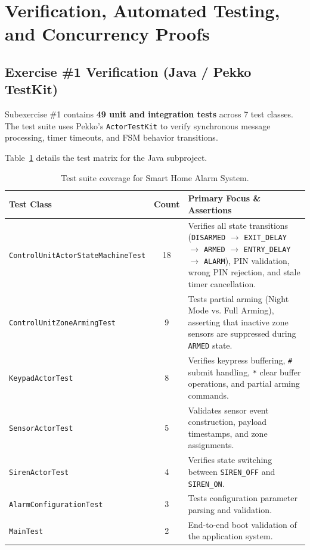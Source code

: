 \documentclass[11pt,a4paper]{article}
\begin{document}
\section{Verification, Automated Testing, and Concurrency Proofs}

\subsection{Exercise \#1 Verification (Java / Pekko TestKit)}

Subexercise \#1 contains \textbf{49 unit and integration tests} across 7 test classes. The test suite uses Pekko's \texttt{ActorTestKit} to verify synchronous message processing, timer timeouts, and FSM behavior transitions.

Table~\ref{tab:java-tests} details the test matrix for the Java subproject.

\begin{table}[h]
\centering
\small
\caption{Test suite coverage for Smart Home Alarm System.}
\label{tab:java-tests}
\begin{tabularx}{\textwidth}{l c >{\raggedright\arraybackslash}X}
\toprule
\textbf{Test Class} & \textbf{Count} & \textbf{Primary Focus \& Assertions} \\
\midrule
\texttt{ControlUnitActorStateMachineTest} & 18 & Verifies all state transitions (\texttt{DISARMED} $\to$ \texttt{EXIT\_DELAY} $\to$ \texttt{ARMED} $\to$ \texttt{ENTRY\_DELAY} $\to$ \texttt{ALARM}), PIN validation, wrong PIN rejection, and stale timer cancellation. \\
\texttt{ControlUnitZoneArmingTest} & 9 & Tests partial arming (Night Mode vs. Full Arming), asserting that inactive zone sensors are suppressed during \texttt{ARMED} state. \\
\texttt{KeypadActorTest} & 8 & Verifies keypress buffering, \texttt{\#} submit handling, \texttt{*} clear buffer operations, and partial arming commands. \\
\texttt{SensorActorTest} & 5 & Validates sensor event construction, payload timestamps, and zone assignments. \\
\texttt{SirenActorTest} & 4 & Verifies state switching between \texttt{SIREN\_OFF} and \texttt{SIREN\_ON}. \\
\texttt{AlarmConfigurationTest} & 3 & Tests configuration parameter parsing and validation. \\
\texttt{MainTest} & 2 & End-to-end boot validation of the application system. \\
\bottomrule
\end{tabularx}
\end{table}
\end{document}

